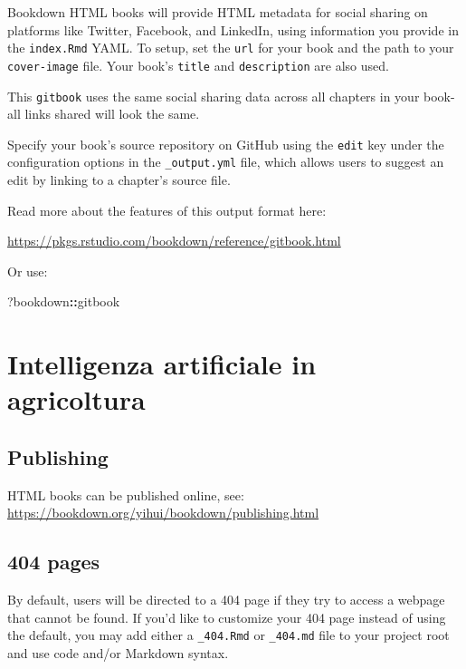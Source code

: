 \documentclass[
]{book}
\newenvironment{Shaded}{\begin{snugshade}}{\end{snugshade}}
\newcommand{\NormalTok}[1]{#1}
\newcommand{\SpecialCharTok}[1]{\textcolor[rgb]{0.81,0.36,0.00}{\textbf{#1}}}
\theoremstyle{definition}
\theoremstyle{definition}
\theoremstyle{definition}
\theoremstyle{definition}
\theoremstyle{remark}
\begin{document}
Bookdown HTML books will provide HTML metadata for social sharing on platforms like Twitter, Facebook, and LinkedIn, using information you provide in the \texttt{index.Rmd} YAML. To setup, set the \texttt{url} for your book and the path to your \texttt{cover-image} file. Your book's \texttt{title} and \texttt{description} are also used.

This \texttt{gitbook} uses the same social sharing data across all chapters in your book- all links shared will look the same.

Specify your book's source repository on GitHub using the \texttt{edit} key under the configuration options in the \texttt{\_output.yml} file, which allows users to suggest an edit by linking to a chapter's source file.

Read more about the features of this output format here:

\url{https://pkgs.rstudio.com/bookdown/reference/gitbook.html}

Or use:

\begin{Shaded}
\begin{Highlighting}[]
\NormalTok{?bookdown}\SpecialCharTok{::}\NormalTok{gitbook}
\end{Highlighting}
\end{Shaded}

\hypertarget{intelligenza-artificiale-in-agricoltura}{%
\chapter{Intelligenza artificiale in agricoltura}\label{intelligenza-artificiale-in-agricoltura}}

\hypertarget{publishing-1}{%
\section{Publishing}\label{publishing-1}}

HTML books can be published online, see: \url{https://bookdown.org/yihui/bookdown/publishing.html}

\hypertarget{pages-1}{%
\section{404 pages}\label{pages-1}}

By default, users will be directed to a 404 page if they try to access a webpage that cannot be found. If you'd like to customize your 404 page instead of using the default, you may add either a \texttt{\_404.Rmd} or \texttt{\_404.md} file to your project root and use code and/or Markdown syntax.
\end{document}
